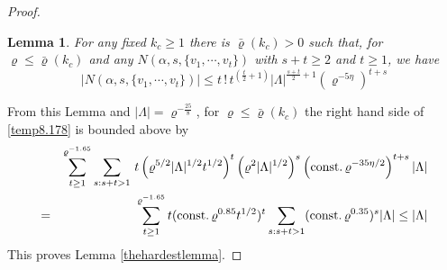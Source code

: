 \documentclass[11pt]{article}
\numberwithin{equation}{section}
\newcommand{\beq}{\begin{equation}}
\newcommand{\eeq}{\end{equation}}
\newcommand{\beqa}{\begin{eqnarray}}
\newcommand{\eeqa}{\end{eqnarray}}
\newcommand\const{{\rm const.\, }}
\newcommand\al{{\alpha}}
\renewcommand\rho\varrho
\newtheorem{lem}{Lemma}[section]
\theoremstyle{definition}
\begin{document}
\begin{proof}
\begin{lem}\label{lem11.1}
For any fixed $k_c\geq 1$ there is $\bar\rho(k_c)>0$ such that, for $\rho\leq\bar\rho(k_c)$ and any $N(\al, s,\{v_1,\cdots,v_t\})$ with $s+t\geq 2$ and $t\geq 1$, we have 
\beq\label{0.025}
\left|N(\al, s,\{v_1,\cdots,v_t\})\right|\leq t\,!\,t^{(\frac {t}2+1)}|\Lambda|^{\frac{s+t}2+1} (\rho^{-5\eta})^{t+s}
\eeq
\end{lem}

{F}rom this Lemma and  $|\Lambda|=\rho^{-\frac{25}{8}}$, for $\rho\leq\bar\rho(k_c)$ the right hand side of \eqref{temp8.178} is bounded above by 
\beqa\nonumber
&&\sum_{t\geq 1}^{\rho^{-1.65}}\sum_{s: s+ t>1}\,t\left(\rho^{5/2}|\Lambda|^{1/2}t^{1/2}\right)^t\left(\rho^{2}|\Lambda|^{1/2}\right)^s \left(\const\rho^{-35\eta/2}\right)^{t+s}|\Lambda|\\\nonumber
=&&\sum_{t\geq 1}^{\rho^{-1.65}}t(\const\rho^{0.85}t^{1/2})^{t}\sum_{s: s+ t>1}(\const\rho^{0.35})^s|\Lambda|\leq |\Lambda|
\eeqa
This proves Lemma \ref{thehardestlemma}.  

 \end{proof}
\end{document}
